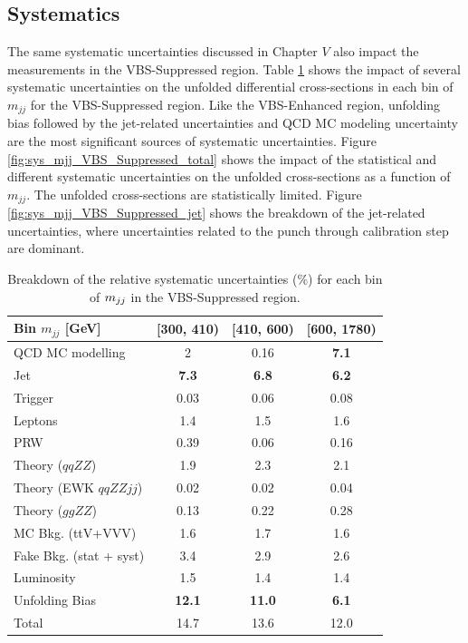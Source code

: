 \subsection{Systematics}
\label{appendix:VBSSupSys}
The same systematic uncertainties discussed in Chapter $V$ also impact the measurements in the VBS-Suppressed region. Table \ref{tab:systematics_mjj_VBS_Suppressed} shows the impact of several systematic uncertainties on the unfolded differential cross-sections in each bin of $m_{jj}$ for the VBS-Suppressed region. Like the VBS-Enhanced region, unfolding bias followed by the jet-related uncertainties and QCD MC modeling uncertainty are the most significant sources of systematic uncertainties. Figure \ref{fig:sys_mjj_VBS_Suppressed_total} shows the impact of the statistical and different systematic uncertainties on the unfolded cross-sections as a function of $m_{jj}$. The unfolded cross-sections are statistically limited. Figure \ref{fig:sys_mjj_VBS_Suppressed_jet} shows the breakdown of the jet-related uncertainties, where uncertainties related to the punch through calibration step are dominant.  

\begin{table}[!htbp]
    \centering
    \caption{Breakdown of the relative systematic uncertainties ($\%$) for each bin of $m_{jj}$ in the VBS-Suppressed region. \label{tab:systematics_mjj_VBS_Suppressed}}
    \begin{tabular}{|l || c | c | c | }
    \hline 
    Bin $m_{jj}$ [GeV] & [300, 410) & [410, 600) & [600, 1780)\\
    \hline 
    QCD MC modelling & 2 & 0.16 & \textbf{7.1}\\
    Jet & \textbf{7.3} & \textbf{6.8} & \textbf{6.2 }\\
    Trigger & 0.03 & 0.06 & 0.08 \\
    Leptons & 1.4 & 1.5 & 1.6 \\
    PRW & 0.39 & 0.06 & 0.16\\
    Theory ($qqZZ$) & 1.9 & 2.3 & 2.1 \\
    Theory (EWK $qqZZjj$) & 0.02 & 0.02 & 0.04 \\
    Theory ($ggZZ$) & 0.13 & 0.22 & 0.28 \\
    MC Bkg. (ttV+VVV) & 1.6 & 1.7 & 1.6 \\
    Fake Bkg. (stat + syst) & 3.4 & 2.9 & 2.6 \\
    Luminosity & 1.5 & 1.4 & 1.4 \\
    Unfolding Bias & \textbf{12.1} & \textbf{11.0} & \textbf{6.1}\\
    \hline
    Total & 14.7 & 13.6 & 12.0 \\
    \hline
    \end{tabular}
\end{table}

